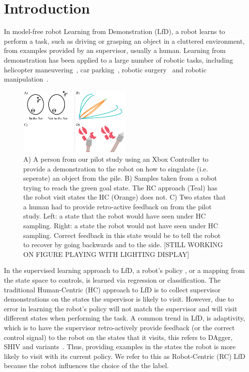 \documentclass[10pt, conference]{ieeeconf}      %
\begin{document}
\section{Introduction} 
In model-free robot Learning from Demonstration (LfD), a robot learns to perform a task, such as driving or grasping an object in a cluttered environment, from examples provided by an supervisor, usually a human. Learning from demonstration has been applied to a large number of robotic tasks, including helicopter maneuvering~\cite{abbeel2007application}, car parking~\cite{abbeel2008apprenticeship}, robotic surgery~\cite{van2010superhuman,laskeyshiv} and robotic manipulation~\cite{laskeyrobot}. 

\begin{figure}
\center
\includegraphics[width=0.5\textwidth]{f_figs/teaser.eps}
\caption{
    \footnotesize
 A) A person from our pilot study using an Xbox Controller to provide a demonstration to the robot on how to singulate (i.e. seperate) an object from the pile.  B) Samples taken from a robot trying to reach the green goal state. The RC approach (Teal) has the robot visit states the HC (Orange) does not. C) Two states that a human had to provide retro-active feedback on from the pilot study. Left: a state that the robot would have seen under HC sampling. Right: a state the robot would not have seen under HC sampling. Correct feedback in this state would be to tell the robot to recover by going backwards and to the side. [STILL WORKING ON FIGURE PLAYING WITH LIGHTING DISPLAY]}
\vspace*{-20pt}
\label{fig:teaserl}
\end{figure}


In the supervised learning approach to LfD, a robot's policy , or a mapping from the state space to controls, is learned via regression or classification. The traditional Human-Centric (HC) approach to LfD is to collect supervisor demonstrations on the states the supervisor is likely to visit. However, due to error in learning the robot's policy will not match the supervisor and will visit different states when performing the task. A common trend in LfD, is adaptivity, which is to have the supervisor retro-actively provide feedback (or the correct control signal) to the robot on the states that it visits, this refers to DAgger, SHIV and variants~\cite{ross2010efficient,ross2010reduction,laskeyrobot,laskeyshiv,he2012imitation}.
Thus, providing examples in the states the robot is more likely to visit with its current policy. We refer to this as Robot-Centric (RC) LfD because the robot influences the choice of the the label. 
\end{document}

